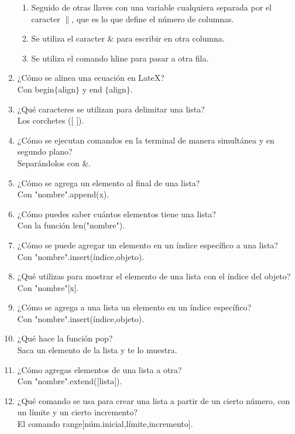 \documentclass[letterpaper, 12pt, oneside]{article} %
\begin{document}
\begin{enumerate}
\begin{enumerate}
			\item Seguido de otras llaves con una variable cualquiera separada por el caracter $\|$, que es lo que define el número de columnas.
			\item Se utiliza el caracter $\&$ para escribir en otra columna. 
			\item Se utiliza el comando hline para pasar a otra fila.
		\end{enumerate}
		\item ¿Cómo se alinea una ecuación en LateX?\\Con begin$\{$align$\}$ y end $\{$align$\}$.
		\item ¿Qué caracteres se utilizan para delimitar una lista?\\Los corchetes ($[$ $]$).
		\item ¿Cómo se ejecutan comandos en la terminal de manera simultánea y en segundo plano?\\Separándolos con $\&$.
		\item ¿Cómo se agrega un elemento al final de una lista?\\Con "nombre".append(x).
		\item ¿Cómo puedes saber cuántos elementos tiene una lista?\\Con la función len("nombre").
		\item ¿Cómo se puede agregar un elemento en un índice específico a una lista?\\Con "nombre".insert(índice,objeto).
		\item ¿Qué utilizas para mostrar el elemento de una lista con el índice del objeto?\\Con "nombre"$[$x$]$.
		\item ¿Cómo se agrega a una lista un elemento en un índice específico?\\Con "nombre".insert(índice,objeto).
		\item ¿Qué hace la función pop?\\Saca un elemento de la lista y te lo muestra. 
		\item ¿Cómo agregas elementos de una lista a otra?\\Con "nombre".extend([lista]).
		\item ¿Qué comando se usa para crear una lista a partir de un cierto número, con un límite y un cierto incremento?\\El comando range[núm.inicial,límite,incremento].
	\end{enumerate}
\end{document}
